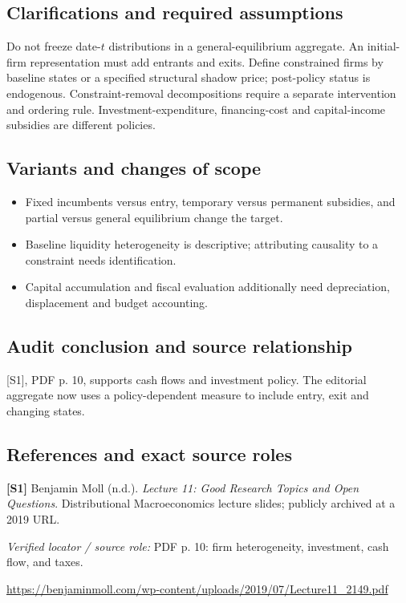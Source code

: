 \documentclass[11pt,a4paper]{article}
\begin{document}
\subsection*{Clarifications and required assumptions}

Do not freeze date-\(t\) distributions in a general-equilibrium aggregate. An initial-firm representation must add entrants and exits. Define constrained firms by baseline states or a specified structural shadow price; post-policy status is endogenous. Constraint-removal decompositions require a separate intervention and ordering rule. Investment-expenditure, financing-cost and capital-income subsidies are different policies.

\subsection*{Variants and changes of scope}

\begin{itemize}
\item Fixed incumbents versus entry, temporary versus permanent subsidies, and partial versus general equilibrium change the target.
\item Baseline liquidity heterogeneity is descriptive; attributing causality to a constraint needs identification.
\item Capital accumulation and fiscal evaluation additionally need depreciation, displacement and budget accounting.
\end{itemize}

\subsection*{Audit conclusion and source relationship}

[S1], PDF p. 10, supports cash flows and investment policy. The editorial aggregate now uses a policy-dependent measure to include entry, exit and changing states.

\subsection*{References and exact source roles}

{\footnotesize\raggedright
\par\noindent\textbf{[S1]} Benjamin Moll (n.d.). \emph{Lecture 11: Good Research Topics and Open Questions}. Distributional Macroeconomics lecture slides; publicly archived at a 2019 URL.\par \textit{Verified locator / source role:} PDF p. 10: firm heterogeneity, investment, cash flow, and taxes.\par \url{https://benjaminmoll.com/wp-content/uploads/2019/07/Lecture11_2149.pdf}\par\smallskip
}
\end{document}
